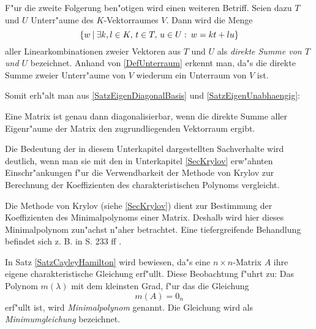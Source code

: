 F"ur die zweite Folgerung ben"otigen wird einen weiteren Betriff. Seien
dazu $T$ und $U$ Unterr"aume des $K$-Vektorraumes $V$. Dann wird die Menge
\[
   \{ w \: | \: 
      \exists k,l \in K, \, t \in T, \, u \in U: \: w=kt+lu \}
\]
aller Linearkombinationen zweier Vektoren aus $T$ und $U$ als
{\em direkte Summe von $T$ und $U$}  bezeichnet.
Anhand von \ref{DefUnterraum} erkennt man, da"s die direkte Summe
zweier Unterr"aume von $V$ wiederum ein Unterraum von $V$ ist.

Somit erh"alt man aus
\ref{SatzEigenDiagonalBasis} und \ref{SatzEigenUnabhaengig}:

\begin{korollar}
\label{SatzEigenraum}
    Eine Matrix ist genau dann diagonalisierbar, wenn die direkte Summe
    aller Eigenr"aume der Matrix den zugrundliegenden Vektorraum ergibt.
\end{korollar}

Die Bedeutung der in diesem Unterkapitel dargestellten Sachverhalte
wird deutlich, wenn man sie mit den in Unterkapitel
\ref{SecKrylov} erw"ahnten Einschr"ankungen f"ur die
Verwendbarkeit der Methode von Krylov zur Berechnung der Koeffizienten 
des charakteristischen Polynoms vergleicht.




\label{SecMinimalpolynom}

Die Methode von Krylov (siehe \ref{SecKrylov}) dient zur Bestimmung der
Koeffizienten des Minimalpolynoms einer Matrix. Deshalb wird hier dieses
Minimalpolynom zun"achst n"aher betrachtet. Eine tiefergreifende 
Behandlung befindet sich z. B. in \cite{Zurm64} S. 233 ff .

In Satz \ref{SatzCayleyHamilton} wird bewiesen, da"s eine
$n \times n$-Matrix $A$ ihre eigene charakteristische Gleichung erf"ullt.
Diese Beobachtung f"uhrt zu: \nopagebreak[3]
\MyBeginDef
\label{DefMinimalpolynom} 
 
    Das Polynom $m(\lambda)$ mit dem kleinsten Grad, f"ur das die 
    Gleichung \[ m(A) = 0_n \] erf"ullt ist, wird 
    {\em Minimalpolynom} genannt. Die Gleichung wird als 
    {\em Minimumgleichung}  bezeichnet.
\MyEndDef

